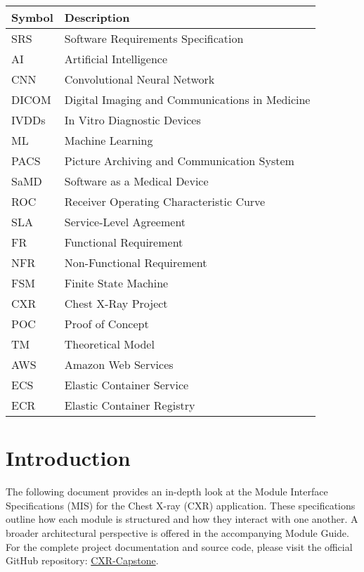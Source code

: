 \documentclass[12pt, titlepage]{article}
\begin{document}
\renewcommand{\arraystretch}{1.3}
\noindent \begin{tabular}{l l} 
  \toprule		
  \textbf{Symbol} & \textbf{Description}\\
  \midrule 
  SRS & Software Requirements Specification\\
  AI & Artificial Intelligence\\
  CNN & Convolutional Neural Network\\
  DICOM & Digital Imaging and Communications in Medicine\\
  IVDDs & In Vitro Diagnostic Devices\\
  ML & Machine Learning\\
  PACS & Picture Archiving and Communication System\\
  SaMD & Software as a Medical Device\\
  ROC & Receiver Operating Characteristic Curve\\
  SLA & Service-Level Agreement\\
  FR & Functional Requirement\\
  NFR & Non-Functional Requirement\\
  FSM & Finite State Machine\\
  CXR & Chest X-Ray Project\\
  POC & Proof of Concept\\
  TM & Theoretical Model\\
  AWS & Amazon Web Services\\
  ECS & Elastic Container Service\\
  ECR & Elastic Container Registry\\
  \bottomrule
\end{tabular}

\newpage

\tableofcontents

\newpage


\section{Introduction}

The following document provides an in-depth look at the Module Interface Specifications (MIS) for the Chest X-ray (CXR) application. These specifications outline how each module is structured and how they interact with one another. A broader architectural perspective is offered in the accompanying Module Guide. For the complete project documentation and source code, please visit the official GitHub repository: \href{https://github.com/RezaJodeiri/CXR-Capstone}{CXR-Capstone}.
\end{document}

